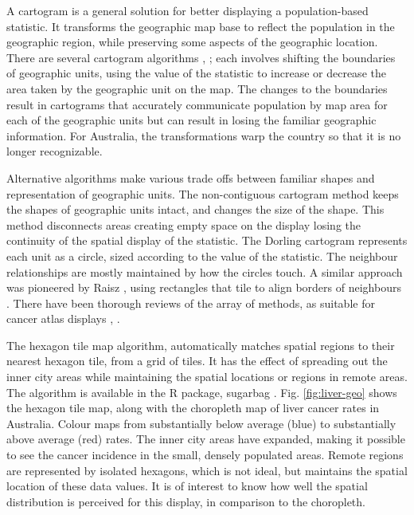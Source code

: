 \documentclass{monashthesis}
\begin{document}
A cartogram is a general solution for better displaying a population-based statistic. It transforms the geographic map base to reflect the population in the geographic region, while preserving some aspects of the geographic location. There are several cartogram algorithms \autocite{ACTUC}, \autocite{CBATCC}; each involves shifting the boundaries of geographic units, using the value of the statistic to increase or decrease the area taken by the geographic unit on the map. The changes to the boundaries result in cartograms that accurately communicate population by map area for each of the geographic units but can result in losing the familiar geographic information. For Australia, the transformations warp the country so that it is no longer recognizable.

Alternative algorithms make various trade offs between familiar shapes and representation of geographic units. The non-contiguous cartogram method \autocite{NAC} keeps the shapes of geographic units intact, and changes the size of the shape. This method disconnects areas creating empty space on the display losing the continuity of the spatial display of the statistic. The Dorling cartogram \autocite{ACTUC} represents each unit as a circle, sized according to the value of the statistic. The neighbour relationships are mostly maintained by how the circles touch. A similar approach was pioneered by Raisz \autocite*{RSCW}, using rectangles that tile to align borders of neighbours \autocite{CDWCS}. There have been thorough reviews of the array of methods, as suitable for cancer atlas displays \autocite{review}, \autocite{BCM}.

The hexagon tile map algorithm, automatically matches spatial regions to their nearest hexagon tile, from a grid of tiles. It has the effect of spreading out the inner city areas while maintaining the spatial locations or regions in remote areas. The algorithm is available in the R package, sugarbag \autocite{sugarbag}. Fig. \ref{fig:liver-geo} shows the hexagon tile map, along with the choropleth map of liver cancer rates in Australia. Colour maps from substantially below average (blue) to substantially above average (red) rates. The inner city areas have expanded, making it possible to see the cancer incidence in the small, densely populated areas. Remote regions are represented by isolated hexagons, which is not ideal, but maintains the spatial location of these data values. It is of interest to know how well the spatial distribution is perceived for this display, in comparison to the choropleth.
\end{document}

